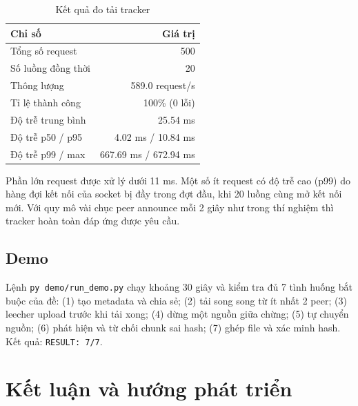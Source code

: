 \documentclass[12pt,a4paper,oneside]{report}
\begin{document}
\begin{table}[H]
\centering
\caption{Kết quả đo tải tracker}
\begin{tabular}{@{}lr@{}}
\toprule
\textbf{Chỉ số} & \textbf{Giá trị}\\\midrule
Tổng số request & 500\\
Số luồng đồng thời & 20\\
Thông lượng & 589.0 request/s\\
Tỉ lệ thành công & 100\% (0 lỗi)\\
Độ trễ trung bình & 25.54 ms\\
Độ trễ p50 / p95 & 4.02 ms / 10.84 ms\\
Độ trễ p99 / max & 667.69 ms / 672.94 ms\\
\bottomrule
\end{tabular}
\end{table}

Phần lớn request được xử lý dưới 11 ms. Một số ít request có độ trễ cao (p99) do hàng đợi kết nối của socket bị đầy trong đợt đầu, khi 20 luồng cùng mở kết nối mới. Với quy mô vài chục peer announce mỗi 2 giây như trong thí nghiệm thì tracker hoàn toàn đáp ứng được yêu cầu.

\section{Demo}
Lệnh \texttt{py demo/run\_demo.py} chạy khoảng 30 giây và kiểm tra đủ 7 tình huống bắt buộc của đề: (1) tạo metadata và chia sẻ; (2) tải song song từ ít nhất 2 peer; (3) leecher upload trước khi tải xong; (4) dừng một nguồn giữa chừng; (5) tự chuyển nguồn; (6) phát hiện và từ chối chunk sai hash; (7) ghép file và xác minh hash. Kết quả: \texttt{RESULT: 7/7}.

\chapter{Kết luận và hướng phát triển}
\end{document}
